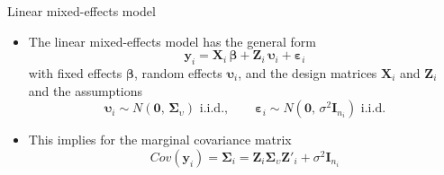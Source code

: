 \documentclass[aspectratio=169]{beamer}
\newcommand{\vect}[1]{\mathbf{#1}}
\newcommand{\mat}[1]{\mathbf{#1}}
\newcommand{\gvect}[1]{\boldsymbol{#1}}
\newcommand{\gmat}[1]{\boldsymbol{#1}}
\begin{document}
\begin{frame}{Linear mixed-effects model}
  \begin{itemize}
    \item The linear mixed-effects model has the general form
\[
  \vect{y}_i = \mat{X}_i \, \gvect{\beta} + \mat{Z}_i \, \gvect{\upsilon}_i +
               \gvect{\varepsilon}_i
\]
with fixed effects $\gvect{\beta}$, random effects
$\gvect{\upsilon}_i$, and the design matrices $\mat{X}_i$ and $\mat{Z}_i$
  and the assumptions
\[
  \gvect{\upsilon}_i \sim N(\vect{0}, \, \gmat{\Sigma}_\upsilon)
    \text{ i.i.d.}, \qquad
  \gvect{\varepsilon}_i \sim N(\vect{0}, \, \sigma^2 \mat{I}_{n_i})
    \text{ i.i.d.}
\]
\item This implies for the marginal covariance matrix
\[
  Cov(\vect{y}_i) = \gmat{\Sigma}_i =
    \mat{Z}_i \gmat{\Sigma}_\upsilon \mat{Z}'_i + \sigma^2 \mat{I}_{n_i}
\]
  \end{itemize}
\end{frame}
\end{document}

